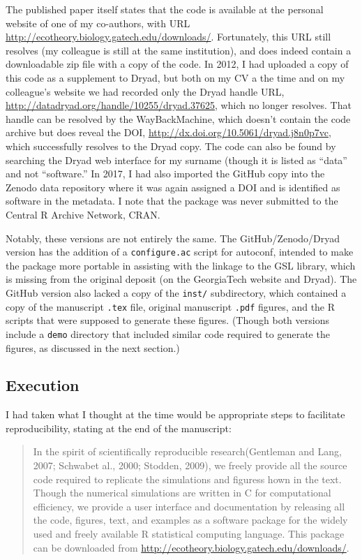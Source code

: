 \documentclass[
]{rescience}
\begin{document}
The published paper itself states that the code is available at the
personal website of one of my co-authors, with URL
\url{http://ecotheory.biology.gatech.edu/downloads/}. Fortunately, this
URL still resolves (my colleague is still at the same institution), and
does indeed contain a downloadable zip file with a copy of the code. In
2012, I had uploaded a copy of this code as a supplement to Dryad, but
both on my CV a the time and on my colleague's website we had recorded
only the Dryad handle URL,
\url{http://datadryad.org/handle/10255/dryad.37625}, which no longer
resolves. That handle can be resolved by the WayBackMachine, which
doesn't contain the code archive but does reveal the DOI,
\url{http://dx.doi.org/10.5061/dryad.j8n0p7vc}, which successfully
resolves to the Dryad copy. The code can also be found by searching the
Dryad web interface for my surname (though it is listed as ``data'' and
not ``software.'' In 2017, I had also imported the GitHub copy into the
Zenodo data repository where it was again assigned a DOI and is
identified as software in the metadata. I note that the package was
never submitted to the Central R Archive Network, CRAN.

Notably, these versions are not entirely the same. The
GitHub/Zenodo/Dryad version has the addition of a \texttt{configure.ac}
script for autoconf, intended to make the package more portable in
assisting with the linkage to the GSL library, which is missing from the
original deposit (on the GeorgiaTech website and Dryad). The GitHub
version also lacked a copy of the \texttt{inst/} subdirectory, which
contained a copy of the manuscript \texttt{.tex} file, original
manuscript \texttt{.pdf} figures, and the R scripts that were supposed
to generate these figures. (Though both versions include a \texttt{demo}
directory that included similar code required to generate the figures,
as discussed in the next section.)

\hypertarget{execution}{%
\subsection{Execution}\label{execution}}

I had taken what I thought at the time would be appropriate steps to
facilitate reproducibility, stating at the end of the manuscript:

\begin{quote}
In the spirit of scientifically reproducible research(Gentleman and
Lang, 2007; Schwabet al., 2000; Stodden, 2009), we freely provide all
the source code required to replicate the simulations and figuress hown
in the text. Though the numerical simulations are written in C for
computational efficiency, we provide a user interface and documentation
by releasing all the code, figures, text, and examples as a software
package for the widely used and freely available R statistical computing
language. This package can be downloaded from
\url{http://ecotheory.biology.gatech.edu/downloads/}.
\end{quote}
\end{document}
